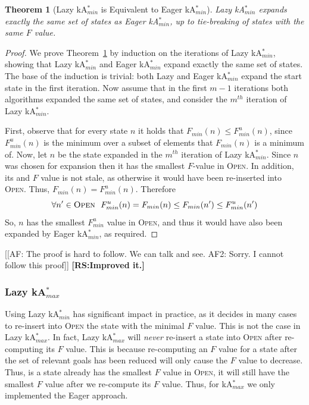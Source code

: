 \documentclass{aicom2e}
\newtheorem{theorem}{Theorem}
\newcommand{\kastarmin}{kA$^*_{min}$}
\newcommand{\kastarmax}{kA$^*_{max}$}
\newcommand{\open}{\textsc{Open}}
\newcommand{\roni}[1]{\textbf{[RS:#1]}}
\begin{document}
\begin{theorem}[Lazy \kastarmin{} is Equivalent to Eager \kastarmin{}]
Lazy \kastarmin{} expands exactly the same set of states as Eager \kastarmin{}, up to tie-breaking of states with the same $F$ value.
\label{the:lazy-minf-correct}
\end{theorem}
\begin{proof}
We prove Theorem~\ref{the:lazy-minf-correct} by induction on the iterations
of Lazy \kastarmin{}, showing that Lazy \kastarmin{} and Eager \kastarmin{} expand exactly the same set of states.
The base of the induction is trivial: both Lazy and Eager \kastarmin{} expand the start state in the first iteration.
Now assume that in the first $m-1$ iterations both algorithms expanded the same set of states,
and consider the $m^{th}$ iteration of Lazy \kastarmin{}.

First, observe that for every state $n$ it holds that $F_{min}(n)\leq F^u_{min}(n)$, since $F^u_{min}(n)$ is the minimum over a subset of elements that $F_{min}(n)$ is a minimum of.
Now, let $n$ be the state expanded in the $m^{th}$ iteration of Lazy \kastarmin{}.
Since $n$ was chosen for expansion then it has the smallest $F$-value in \open{}.
In addition, its and $F$ value is not stale, as otherwise it
would have been re-inserted into \open{}. Thus, $F_{min}(n)=F^u_{min}(n)$.
Therefore
\[ \forall n'\in\open{} ~~ F^u_{min}(n)=F_{min}(n)\leq F_{min}(n') \leq F^u_{min}(n') \]
    So, $n$ has the smallest $F^u_{min}$ value in \open{}, and thus it would have also been expanded by Eager \kastarmin{}, as required.
\end{proof}
[[AF: The proof is hard to follow. We can talk and see. AF2: Sorry. I cannot
follow this proof]]
\roni{Improved it.}




\subsubsection{Lazy \kastarmax{}}
Using Lazy \kastarmin{} has significant impact in practice, as it decides
in many cases to re-insert into \open{} the state with the minimal $F$ value. This is not the case in Lazy \kastarmax{}. In fact, Lazy \kastarmax{} will {\em never} re-insert a state into \open{} after re-computing its $F$ value.
This is because re-computing an $F$ value for a state after the set of relevant goals has been reduced will only cause the $F$ value to decrease. Thus, is a state already has the smallest $F$ value in \open{}, it will still have the smallest $F$ value after we re-compute its $F$ value.
Thus, for \kastarmax{} we only implemented the Eager approach.
\end{document}

